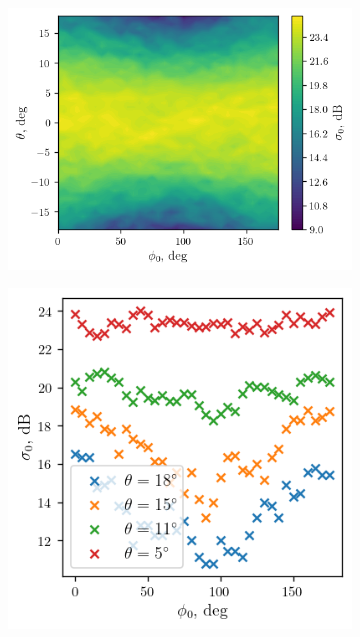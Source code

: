 \documentclass{article}
\begin{document}
\begin{figure}[t]
    \centering
    \begin{subfigure}{\linewidth}
        \centering
        \includegraphics[width=0.8\linewidth]{figs/direction.png}
        \caption{}
        \label{scap:crosssec_direction:1}
    \end{subfigure}

    \begin{subfigure}{\linewidth}
        \centering
        \includegraphics[width=0.6\linewidth]{figs/direction_slices1.png}
        \caption{}
        \label{scap:crosssec_direction:2}
    \end{subfigure}


\end{figure}
\end{document}
